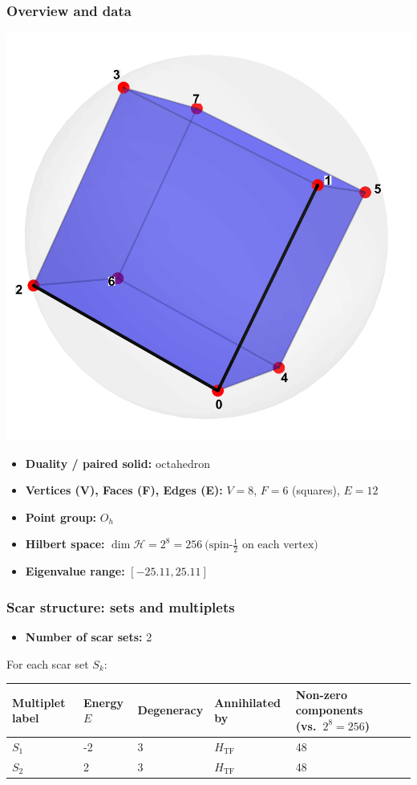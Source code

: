 \documentclass[11pt,a4paper]{article}
\newcommand{\Htf}{H_{\mathrm{TF}}}
\begin{document}
\subsubsection*{Overview and data}
\begin{center}
  \includegraphics[width=.6\linewidth]{cube}
\end{center}

\begin{itemize}[leftmargin=1.5em]
  \item \textbf{Duality / paired solid:} octahedron
  \item \textbf{Vertices (V), Faces (F), Edges (E):} $V = 8$,\; $F = 6$ (squares),\; $E = 12$
  \item \textbf{Point group:} $O_h$
  \item \textbf{Hilbert space:} \(
        \dim\mathcal{H} = 2^{8} = 256\ \text{(spin-$\tfrac12$ on each vertex)}
        \)
  \item \textbf{Eigenvalue range:} $[-25.11, 25.11]$
\end{itemize}

\subsubsection*{Scar structure: sets and multiplets}

\begin{itemize}[leftmargin=1.5em]
  \item \textbf{Number of scar sets:} 2
  \end{itemize}
  \hspace{6mm}For each scar set $S_k$:\\

\begin{center}
\begin{tabular}{L{3.5cm} C{2.2cm} C{2.2cm} C{2.2cm} C{3.0cm} C{3.2cm}}
\toprule
\textbf{Multiplet label} & \textbf{Energy $E$} & \textbf{Degeneracy} & \textbf{Annihilated by} & \textbf{Non-zero components (vs.\ $2^{8} = 256$)} \\
\midrule
$S_1$ & -2 & 3 & $\Htf$ & 48 \\
\midrule
$S_2$ & 2 & 3 & $\Htf$ & 48 \\
\bottomrule
\end{tabular}
\end{center}
\end{document}
